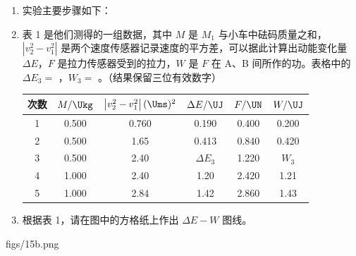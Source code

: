 \documentclass[\gkver]{gaokaozhenti}
\begin{document}
\begin{enumerate}
\begin{enumerate}
	\item
	实验主要步骤如下：
	\item
	表 1 是他们测得的一组数据，其中 $M$ 是 $M_1$ 与小车中砝码质量之和，$|v_2^2-v_1^2|$ 是两个速度传感器记录速度的平方差，可以据此计算出动能变化量 $\Delta E$，$F$ 是拉力传感器受到的拉力，$W$ 是 $F$ 在 A、B 间所作的功。表格中的 $\Delta E_3=$ \tkanswer[1.5cm]{}，$W_3=$ \tkanswer[1.5cm]{}。（结果保留三位有效数字）

\begin{center}
\begin{tabular}{|c|c|c|c|c|c|}
\hline
次数 & $M/\Ukg$ & $\left|v_2^2-v_1^2\right|(\Ums)^2$ & $\Delta E/\UJ$ & $F/\UN$ & $W/\UJ$\\\hline
1 & 0.500 & 0.760 & 0.190 & 0.400 & 0.200\\\hline
2 & 0.500 & 1.65 & 0.413 & 0.840 & 0.420\\\hline
3 & 0.500 & 2.40 & $\Delta E_3$ & 1.220 & $W_3$\\\hline
4 & 1.000 & 2.40 & 1.20 & 2.420 & 1.21\\\hline
5 & 1.000 & 2.84 & 1.42 & 2.860 & 1.43\\\hline
\end{tabular}
\end{center}

	\item
	根据表 1，请在图中的方格纸上作出 $\Delta E-W$ 图线。
\end{enumerate}
{figs/15b.png}


\end{enumerate}
\end{document}
